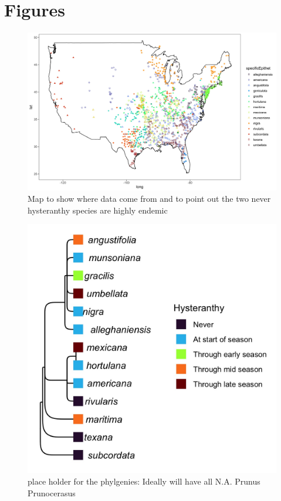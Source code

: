 \documentclass{article}\usepackage[]{graphicx}\usepackage[]{color}
\begin{document}
\section*{Figures}
    \begin{figure}[h!]
    \centering
 \includegraphics[width=\textwidth]{..//..//Plots/map.jpeg}
    \caption{Map to show where data come from and to point out the two never hysteranthy species are highly endemic}
    \label{fig:mappy}
\end{figure}


\begin{figure}[h!]
    \centering
 \includegraphics[width=.6\textwidth]{..//..//Plots/phylosig2.jpeg}
    \caption{place holder for the phylgenies: Ideally will have all N.A. Prunus  Prunocerasus }
    \label{fig:phylo2}
\end{figure}
\end{document}
